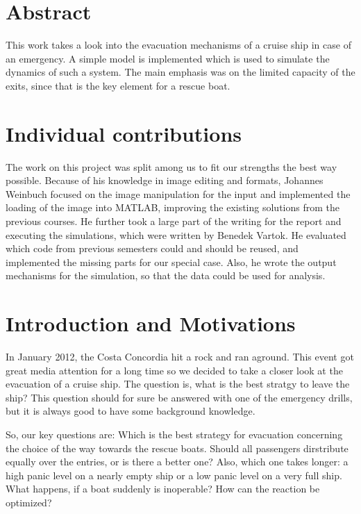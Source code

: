 \documentclass[11pt]{article}
\begin{document}
\section{Abstract}

This work takes a look into the evacuation mechanisms of a cruise ship in case
of an emergency.  A simple model is implemented which is used to simulate the
dynamics of such a system.  The main emphasis was on the limited capacity of
the exits, since that is the key element for a rescue boat. 


\section{Individual contributions}

The work on this project was split among us to fit our strengths the best way
possible.  Because of his knowledge in image editing and formats, Johannes
Weinbuch focused on the image manipulation for the input and implemented the
loading of the image into MATLAB, improving the existing solutions from the
previous courses. He further took a large part of the writing for the report
and executing the simulations, which were written by Benedek Vartok.  He
evaluated which code from previous semesters could and should be reused, and
implemented the missing parts for our special case.  Also, he wrote the output
mechanisms for the simulation, so that the data could be used for analysis.


\section{Introduction and Motivations}

In January 2012, the Costa Concordia hit a rock and ran aground\cite{bbcnews}.
This event got great media attention for a long time so we decided to take a
closer look at the evacuation of a cruise ship.  The question is, what is the
best stratgy to leave the ship?  This question should for sure be answered with
one of the emergency drills, but it is always good to have some background
knowledge.

So, our key questions are: Which is the best strategy for evacuation concerning the choice of the way towards the rescue boats. Should all passengers dirstribute equally over the entries, or is there a better one? Also, which one takes longer: a high panic level on a nearly empty ship or a low panic level on a very full ship. What happens, if a boat suddenly is inoperable? How can the reaction be optimized?
\end{document}
